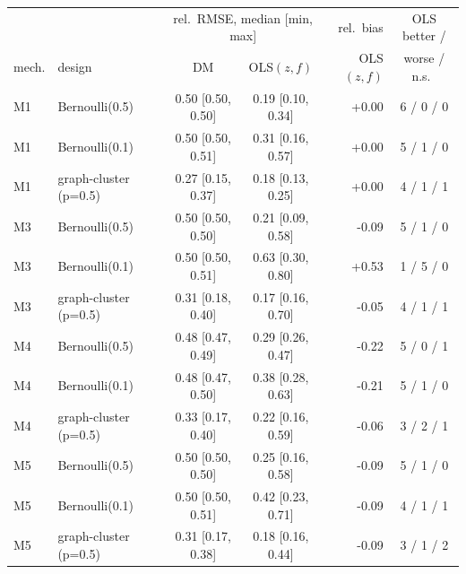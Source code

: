 \begin{tabular}{@{}llccrc@{}}
\toprule
 & & \multicolumn{2}{c}{rel.\ RMSE, median [min, max]} & rel.\ bias & OLS better /\\
mech. & design & DM & OLS$(z,f)$ & OLS$(z,f)$ & worse / n.s.\ \\
\midrule
M1 & Bernoulli(0.5) & 0.50 [0.50, 0.50] & 0.19 [0.10, 0.34] & +0.00 & 6 / 0 / 0 \\
M1 & Bernoulli(0.1) & 0.50 [0.50, 0.51] & 0.31 [0.16, 0.57] & +0.00 & 5 / 1 / 0 \\
M1 & graph-cluster (p=0.5) & 0.27 [0.15, 0.37] & 0.18 [0.13, 0.25] & +0.00 & 4 / 1 / 1 \\
\addlinespace
M3 & Bernoulli(0.5) & 0.50 [0.50, 0.50] & 0.21 [0.09, 0.58] & -0.09 & 5 / 1 / 0 \\
M3 & Bernoulli(0.1) & 0.50 [0.50, 0.51] & 0.63 [0.30, 0.80] & +0.53 & 1 / 5 / 0 \\
M3 & graph-cluster (p=0.5) & 0.31 [0.18, 0.40] & 0.17 [0.16, 0.70] & -0.05 & 4 / 1 / 1 \\
\addlinespace
M4 & Bernoulli(0.5) & 0.48 [0.47, 0.49] & 0.29 [0.26, 0.47] & -0.22 & 5 / 0 / 1 \\
M4 & Bernoulli(0.1) & 0.48 [0.47, 0.50] & 0.38 [0.28, 0.63] & -0.21 & 5 / 1 / 0 \\
M4 & graph-cluster (p=0.5) & 0.33 [0.17, 0.40] & 0.22 [0.16, 0.59] & -0.06 & 3 / 2 / 1 \\
\addlinespace
M5 & Bernoulli(0.5) & 0.50 [0.50, 0.50] & 0.25 [0.16, 0.58] & -0.09 & 5 / 1 / 0 \\
M5 & Bernoulli(0.1) & 0.50 [0.50, 0.51] & 0.42 [0.23, 0.71] & -0.09 & 4 / 1 / 1 \\
M5 & graph-cluster (p=0.5) & 0.31 [0.17, 0.38] & 0.18 [0.16, 0.44] & -0.09 & 3 / 1 / 2 \\
\bottomrule
\end{tabular}
